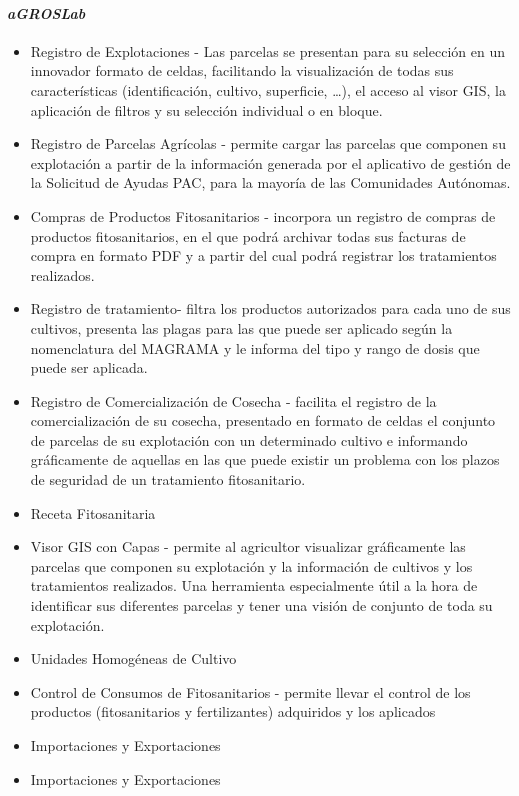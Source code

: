 \paragraph*{\textit{aGROSLab}} \cite{agroslab}
\begin{itemize}
\item Registro de Explotaciones - Las parcelas se presentan para su selección en un innovador formato de celdas, facilitando la visualización de todas sus características (identificación, cultivo, superficie, …), el acceso al visor GIS, la aplicación de filtros y su selección individual o en bloque.
\item Registro de Parcelas Agrícolas - permite cargar las parcelas que componen su explotación a partir de la información generada por el aplicativo de gestión de la Solicitud de Ayudas PAC, para la mayoría de las Comunidades Autónomas.
\item Compras de Productos Fitosanitarios - incorpora un registro de compras de productos fitosanitarios, en el que podrá archivar todas sus facturas de compra en formato PDF y a partir del cual podrá registrar los tratamientos realizados.
\item Registro de \gls{tratamiento}- filtra los productos autorizados para cada uno de sus cultivos, presenta las plagas para las que puede ser aplicado según la nomenclatura del MAGRAMA y le informa del tipo y rango de dosis que puede ser aplicada.
\item Registro de Comercialización de Cosecha - facilita el registro de la comercialización de su cosecha, presentado en formato de celdas el conjunto de parcelas de su explotación con un determinado cultivo e informando gráficamente de aquellas en las que puede existir un problema con los plazos de seguridad de un tratamiento fitosanitario.
\item Receta Fitosanitaria 
\item Visor GIS con Capas - permite al agricultor visualizar gráficamente las parcelas que componen su explotación y la información de cultivos y los tratamientos realizados. Una herramienta especialmente útil a la hora de identificar sus diferentes parcelas y tener una visión de conjunto de toda su explotación.
\item Unidades Homogéneas de Cultivo
\item Control de Consumos de Fitosanitarios - permite llevar el control de los productos (fitosanitarios y fertilizantes) adquiridos y los aplicados
\item Importaciones y Exportaciones 
\item Importaciones y Exportaciones 
\end{itemize}
